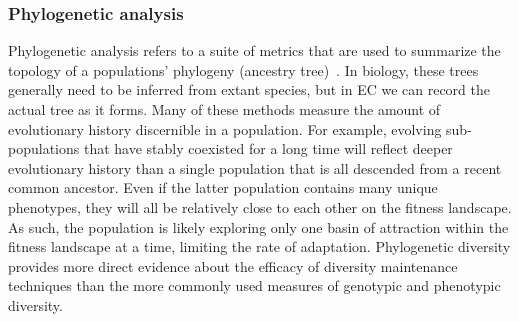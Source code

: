 \subsubsection{Phylogenetic analysis}
Phylogenetic analysis refers to a suite of metrics that are used to summarize the topology of a populations' phylogeny (ancestry tree)~\cite{winter_phylogenetic_2013}. In biology, these trees generally need to be inferred from extant species, but in EC we can record the actual tree as it forms.
Many of these methods measure the amount of evolutionary history discernible in a population. For example, evolving sub-populations that have stably coexisted for a long time will reflect deeper evolutionary history than a single population that is all descended from a recent common ancestor. Even if the latter population contains many unique phenotypes, they will all be relatively close to each other on the fitness landscape. As such, the population is likely exploring only one basin of attraction within the fitness landscape at a time, limiting the rate of adaptation.
Phylogenetic diversity provides more direct evidence about the efficacy of diversity maintenance techniques than the more commonly used measures of genotypic and phenotypic diversity.

